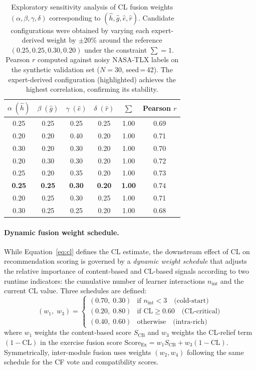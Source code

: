 \documentclass[ASNA,twocolumn]{USG} %
\begin{document}
\begin{table}[ht]
\caption{Exploratory sensitivity analysis of CL fusion weights
$(\alpha,\beta,\gamma,\delta)$ corresponding to
$(\hat{h},\hat{g},\hat{e},\hat{r})$.
Candidate configurations were obtained by varying each expert-derived
weight by $\pm 20\%$ around the reference $(0.25, 0.25, 0.30, 0.20)$
under the constraint $\sum{=}1$.
Pearson $r$ computed against noisy NASA-TLX labels on the
synthetic validation set ($N{=}30$, seed\,=\,42).
The expert-derived configuration (highlighted) achieves the
highest correlation, confirming its stability.}
\label{tab:weight_sensitivity}
\begin{tabular*}{\hsize}{@{\extracolsep{\fill}}ccccc c@{}}
\toprule
$\alpha\;(\hat{h})$ & $\beta\;(\hat{g})$ &
$\gamma\;(\hat{e})$ & $\delta\;(\hat{r})$ &
$\sum$ & Pearson $r$ \\
\midrule
0.25 & 0.25 & 0.25 & 0.25 & 1.00 & 0.69 \\
0.20 & 0.20 & 0.40 & 0.20 & 1.00 & 0.71 \\
0.30 & 0.20 & 0.30 & 0.20 & 1.00 & 0.70 \\
0.20 & 0.30 & 0.30 & 0.20 & 1.00 & 0.72 \\
0.25 & 0.20 & 0.35 & 0.20 & 1.00 & 0.73 \\
\rowcolor{blue!8}
\textbf{0.25} & \textbf{0.25} & \textbf{0.30} & \textbf{0.20}
  & \textbf{1.00} & $\mathbf{0.74}$ \\
0.20 & 0.25 & 0.30 & 0.25 & 1.00 & 0.71 \\
0.30 & 0.25 & 0.25 & 0.20 & 1.00 & 0.68 \\
\bottomrule
\end{tabular*}
\end{table}
\paragraph{Dynamic fusion weight schedule.}
While Equation~\eqref{eq:cl} defines the CL estimate, the downstream
effect of CL on recommendation scoring is governed by a
\emph{dynamic weight schedule} that adjusts the relative importance
of content-based and CL-based signals according to two runtime
indicators: the cumulative number of learner interactions
$n_{\text{int}}$ and the current CL value.
Three schedules are defined:
\begin{equation}
\label{eq:fusion_weights}
(w_1,\; w_3) =
\begin{cases}
(0.70,\; 0.30) & \text{if } n_{\text{int}} < 3
  \quad\text{(cold-start)} \\[4pt]
(0.20,\; 0.80) & \text{if } \text{CL} \geq 0.60
  \quad\text{(CL-critical)} \\[4pt]
(0.40,\; 0.60) & \text{otherwise}
  \quad\text{(intra-rich)}
\end{cases}
\end{equation}
where $w_1$ weights the content-based score $S_{\text{CB}}$ and
$w_3$ weights the CL-relief term $(1-\text{CL})$ in the exercise
fusion score $\text{Score}_{\text{Ex}} = w_1 S_{\text{CB}} +
w_3(1-\text{CL})$.
Symmetrically, inter-module fusion uses weights $(w_2, w_4)$
following the same schedule for the CF vote and compatibility scores.
\end{document}
